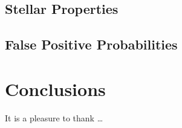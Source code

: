 \documentclass[preprint2]{aastex}
\begin{document}

\subsection{Stellar Properties}
\label{sec:results:stars}


\subsection{False Positive Probabilities}
\label{sec:results:fpp}


\section{Conclusions}
\label{sec:conclusions}

\acknowledgments
It is a pleasure to thank
\ldots\

\clearpage

\clearpage
\end{document}
